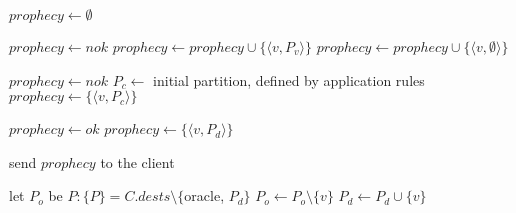 \begin{algorithm}[h!]
\small

\begin{distribalgo}[1]

\vspace{1.5mm}


    \vspace{1.5mm}


    \vspace{1.5mm}

            \STATE $prophecy \leftarrow \emptyset$

                    \STATE $prophecy \leftarrow nok$
                \ELSE
                            \STATE $prophecy \leftarrow prophecy \cup \{\langle v, P_v \rangle \}$
                        \ELSE
                            \STATE $prophecy \leftarrow prophecy \cup \{\langle v, \emptyset \rangle \}$
                        \ENDIF
                    \ENDFOR
                \ENDIF

                    \STATE $prophecy \leftarrow nok$
                \ELSE
                    \STATE $P_c \leftarrow$ initial partition, defined by application rules
                    \STATE $prophecy \leftarrow \{\langle v, P_c \rangle \}$
                \ENDIF

                    \STATE $prophecy \leftarrow ok$
                \ELSE
                    \STATE $prophecy \leftarrow \{\langle v, P_d \rangle \}$
                \ENDIF
                
            \ENDIF
            
            \STATE send $prophecy$ to the client

        \vspace{1.5mm}

            \STATE let $P_o$ be $P : \{P\} = C.dests \setminus \{$oracle, $P_d\}$
                \STATE $P_o \leftarrow P_o \setminus \{v\}$
                \STATE $P_d \leftarrow P_d \cup      \{v\}$
            \ENDIF


\end{distribalgo}
\end{algorithm}
